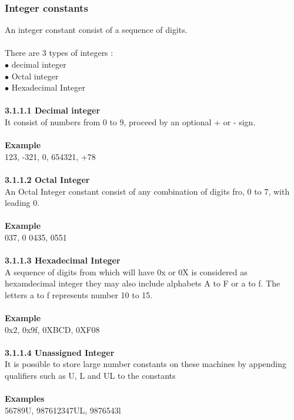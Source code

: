 \documentclass{article}
\begin{document}
	\subsubsection{Integer constants}
	An integer constant consist of a sequence of digits. 
	\\ \\
	There are 3 types of integers : \\
	$ \bullet $ decimal integer \\
	$ \bullet $ Octal integer \\
	$ \bullet $ Hexadecimal Integer
	\\ \\
	\textbf{3.1.1.1 Decimal integer} \\
	It consist of numbers from 0 to 9, proceed by an optional + or - sign.
	\\ \\
	\textbf{Example} \\
	123, -321, 0, 654321, +78 
	\\ \\
	\textbf{3.1.1.2 Octal Integer} \\
	An Octal Integer constant consist of any combination of digits fro, 0 to 7, with leading 0.
	\\ \\
	\textbf{Example} \\
	037, 0 0435, 0551
	\\ \\
	\textbf{3.1.1.3 Hexadecimal Integer} \\
	A sequence of digits from which will have 0x or 0X is considered as hexamdecimal integer they may also include alphabets A to F or a to f. The letters a to f represents number 10 to 15.
	\\ \\
	\textbf{Example} \\
	0x2, 0x9f, 0XBCD, 0XF08
	\\ \\
	\textbf{3.1.1.4 Unassigned Integer} \\
	It is possible to store large number constants on these machines by appending qualifiers such as U, L and UL to the constants
	\\ \\
	\textbf{Examples} \\
	56789U, 987612347UL, 9876543l
	
\end{document}
